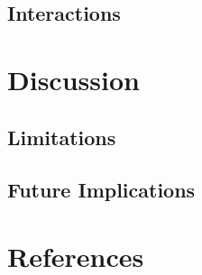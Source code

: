 \documentclass[
  english,
  man]{apa6}
\begin{document}
\hypertarget{interactions}{%
\subsection{Interactions}\label{interactions}}

\hypertarget{discussion}{%
\section{Discussion}\label{discussion}}

\hypertarget{limitations}{%
\subsection{Limitations}\label{limitations}}

\hypertarget{future-implications}{%
\subsection{Future Implications}\label{future-implications}}

\newpage

\hypertarget{references}{%
\section{References}\label{references}}

\begingroup
\setlength{\parindent}{-0.5in}
\setlength{\leftskip}{0.5in}
\end{document}
